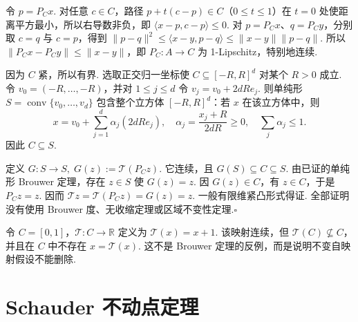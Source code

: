 \begin{FAProof}
令 \(\displaystyle p=P_Cx\). 对任意 \(\displaystyle c\in C\)，路径 \(\displaystyle p+t(c-p)\in C\)（\(\displaystyle0\leqslant t\leqslant1\)）在 \(\displaystyle t=0\) 处使距离平方最小，所以右导数非负，即
\(\displaystyle \langle x-p,c-p\rangle\leqslant0.\)
对 \(\displaystyle p=P_Cx\)、\(\displaystyle q=P_Cy\)，分别取 \(\displaystyle c=q\) 与 \(\displaystyle c=p\)，得到
\(\displaystyle \|p-q\|^2 \leqslant \langle x-y,p-q\rangle \leqslant \|x-y\|\|p-q\|.\)
所以 \(\displaystyle \|P_Cx-P_Cy\|\leqslant\|x-y\|\)，即 \(\displaystyle P_C:A\to C\) 为 1-Lipschitz，特别地连续.

因为 \(\displaystyle C\) 紧，所以有界. 选取正交归一坐标使 \(\displaystyle C\subseteq[-R,R]^d\) 对某个 \(\displaystyle R>0\) 成立. 令 \(\displaystyle v_0=(-R,\dots,-R)\)，并对 \(\displaystyle1\leqslant j\leqslant d\) 令
\(\displaystyle v_j=v_0+2dR e_j.\)
则单纯形 \(\displaystyle S=\operatorname{conv}\{v_0,\dots,v_d\}\) 包含整个立方体 \(\displaystyle[-R,R]^d\)：若 \(\displaystyle x\) 在该立方体中，则
\[
x=v_0+\sum_{j=1}^{d}\alpha_j(2dR e_j),
\quad
\alpha_j=\frac{x_j+R}{2dR}\geqslant0,
\quad
\sum_j\alpha_j\leqslant1.
\]
因此 \(\displaystyle C\subseteq S\).

定义
\(\displaystyle G:S\to S, \; G(z):=\mathcal T(P_Cz).\)
它连续，且 \(\displaystyle G(S)\subseteq C\subseteq S\). 由已证的单纯形 Brouwer 定理，存在 \(\displaystyle z\in S\) 使 \(\displaystyle G(z)=z\). 因 \(\displaystyle G(z)\in C\)，有 \(\displaystyle z\in C\)，于是 \(\displaystyle P_Cz=z\). 因而
\(\displaystyle \mathcal Tz = \mathcal T(P_Cz) = G(z) = z.\)
一般有限维紧凸形式得证. 全部证明没有使用 Brouwer 度、无收缩定理或区域不变性定理.\hfill\(\square\)

\end{FAProof}

\begin{FACounterexample}[不变性失效]\label{iii03:no-invariance-fixed-point}
令 \(\displaystyle C=[0,1]\)，\(\displaystyle \mathcal T:C\to\mathbb R\) 定义为 \(\displaystyle \mathcal T(x)=x+1\). 该映射连续，但 \(\displaystyle \mathcal T(C)\nsubseteq C\)，并且在 \(\displaystyle C\) 中不存在 \(\displaystyle x=\mathcal T(x)\). 这不是 Brouwer 定理的反例，而是说明不变自映射假设不能删除.
\end{FACounterexample}

\newpage
\section{Schauder 不动点定理}\label{sec:iii03-schauder}

